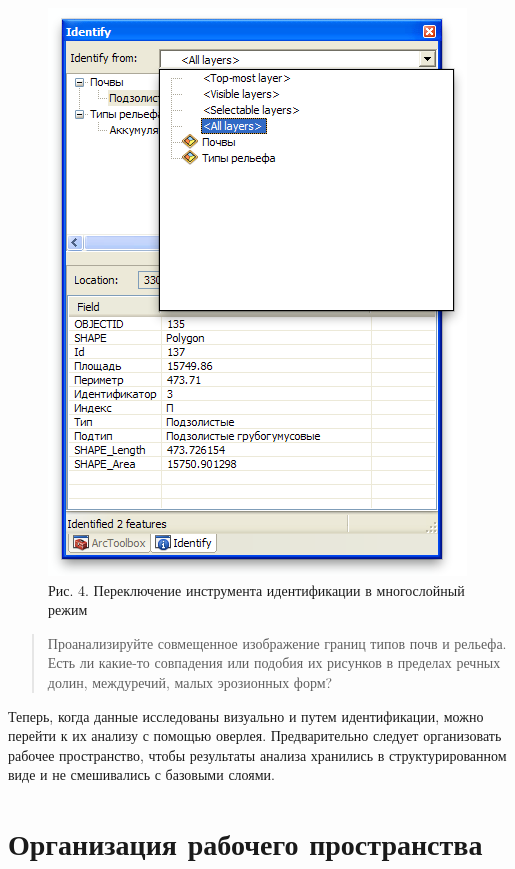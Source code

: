 \documentclass[]{book}
\theoremstyle{definition}
\theoremstyle{definition}
\theoremstyle{definition}
\theoremstyle{remark}
\begin{document}
\begin{enumerate}
  \begin{figure}
  \centering
  \includegraphics{images/Ex10/image7.png}
  \caption{Рис. 4. Переключение инструмента идентификации в многослойный
  режим}
  \end{figure}
\end{enumerate}

\begin{quote}
Проанализируйте совмещенное изображение границ типов почв и рельефа.
Есть ли какие-то совпадения или подобия их рисунков в пределах речных
долин, междуречий, малых эрозионных форм?
\end{quote}

Теперь, когда данные исследованы визуально и путем идентификации, можно
перейти к их анализу с помощью оверлея. Предварительно следует
организовать рабочее пространство, чтобы результаты анализа хранились в
структурированном виде и не смешивались с базовыми слоями.

\hypertarget{overlay-workspace}{%
\section{Организация рабочего пространства}\label{overlay-workspace}}
\end{document}
